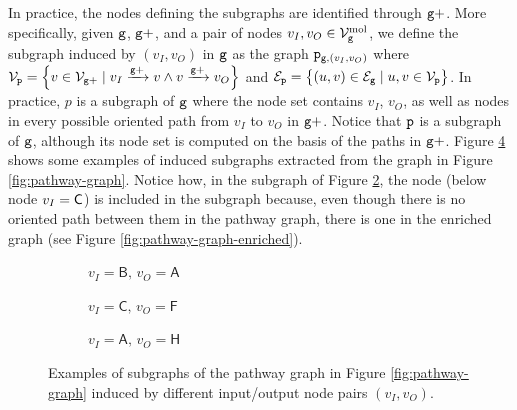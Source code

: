 In practice, the nodes defining the subgraphs are identified through $\mathtt{g+}$. More specifically, given $\mathtt{g}$, $\mathtt{g+}$, and a pair of nodes $v_I, v_O \in \MolNodes{g}$, we define the subgraph induced by $(v_I,v_O)$ in $\mathtt{g}$ as the graph $\mathtt{p}_{\mathtt{g}, (v_I,v_O)}$ where $\Nodes{p} = \Set{v \in \Nodes{g+} \mid \Path{v_I}{\Graph{g+}}{v} \wedge \Path{v}{\Graph{g+}}{v_O}}$ and $\Edges{p} = \Set{(u,v) \in \Edges{g} \mid u,v \in \Nodes{p}}$. In practice, $p$ is a subgraph of $\mathtt{g}$ where the node set contains $v_I$, $v_O$, as well as nodes in every possible oriented path from $v_I$ to $v_O$ in $\mathtt{g+}$. Notice that $\mathtt{p}$ is a subgraph of $\mathtt{g}$, although its node set is computed on the basis of the paths in $\mathtt{g+}$. Figure \ref{fig:subgraphs} shows some examples of induced subgraphs extracted from the graph in Figure \ref{fig:pathway-graph}. Notice how, in the subgraph of Figure \ref{subfig:subgraph2}, the node  (below node $v_I = \mathsf{C}$) is included in the subgraph because, even though there is no oriented path between them in the pathway graph, there is one in the enriched graph (see Figure \ref{fig:pathway-graph-enriched}).
\begin{figure}[h!]
    \begin{subfigure}[b]{0.22\linewidth}
        \centering
        \resizebox{.9\textwidth}{!}{}
        \caption{$v_I=\mathsf{B},\, v_O=\mathsf{A}$}\label{subfig:subgraph1}
    \end{subfigure}
    \begin{subfigure}[b]{0.33\linewidth}
        \centering
        \resizebox{.9\textwidth}{!}{}
        \caption{$v_I=\mathsf{C},\, v_O=\mathsf{F}$}\label{subfig:subgraph2}
    \end{subfigure}
    \begin{subfigure}[b]{0.44\linewidth}
        \centering
        \resizebox{1.\textwidth}{!}{}
        \caption{$v_I=\mathsf{A},\, v_O=\mathsf{H}$}\label{subfig:subgraph3}
    \end{subfigure}
    \caption{Examples of subgraphs of the pathway graph in Figure \ref{fig:pathway-graph} induced by different input/output node pairs $(v_I,v_O)$.}\label{fig:subgraphs}
\end{figure}

